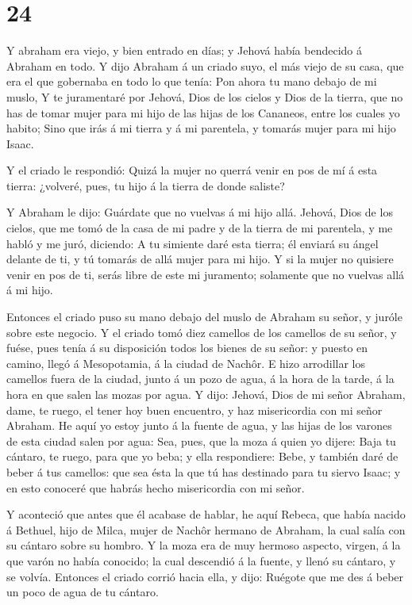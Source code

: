 \hypertarget{section-23}{%
\section{24}\label{section-23}}

 Y abraham era viejo, y bien entrado en días; y Jehová había
bendecido á Abraham en todo.  Y dijo Abraham á un criado
suyo, el más viejo de su casa, que era el que gobernaba en todo lo que
tenía: Pon ahora tu mano debajo de mi muslo,  Y te
juramentaré por Jehová, Dios de los cielos y Dios de la tierra, que no
has de tomar mujer para mi hijo de las hijas de los Cananeos, entre los
cuales yo habito;  Sino que irás á mi tierra y á mi
parentela, y tomarás mujer para mi hijo Isaac.

 Y el criado le respondió: Quizá la mujer no querrá venir en
pos de mí á esta tierra: ¿volveré, pues, tu hijo á la tierra de donde
saliste?

 Y Abraham le dijo: Guárdate que no vuelvas á mi hijo allá.
 Jehová, Dios de los cielos, que me tomó de la casa de mi
padre y de la tierra de mi parentela, y me habló y me juró, diciendo: A
tu simiente daré esta tierra; él enviará su ángel delante de ti, y tú
tomarás de allá mujer para mi hijo.  Y si la mujer no
quisiere venir en pos de ti, serás libre de este mi juramento; solamente
que no vuelvas allá á mi hijo.

 Entonces el criado puso su mano debajo del muslo de Abraham
su señor, y juróle sobre este negocio.  Y el criado tomó
diez camellos de los camellos de su señor, y fuése, pues tenía á su
disposición todos los bienes de su señor: y puesto en camino, llegó á
Mesopotamia, á la ciudad de Nachôr.  E hizo arrodillar los
camellos fuera de la ciudad, junto á un pozo de agua, á la hora de la
tarde, á la hora en que salen las mozas por agua.  Y dijo:
Jehová, Dios de mi señor Abraham, dame, te ruego, el tener hoy buen
encuentro, y haz misericordia con mi señor Abraham.  He
aquí yo estoy junto á la fuente de agua, y las hijas de los varones de
esta ciudad salen por agua:  Sea, pues, que la moza á quien
yo dijere: Baja tu cántaro, te ruego, para que yo beba; y ella
respondiere: Bebe, y también daré de beber á tus camellos: que sea ésta
la que tú has destinado para tu siervo Isaac; y en esto conoceré que
habrás hecho misericordia con mi señor.

 Y aconteció que antes que él acabase de hablar, he aquí
Rebeca, que había nacido á Bethuel, hijo de Milca, mujer de Nachôr
hermano de Abraham, la cual salía con su cántaro sobre su hombro.
 Y la moza era de muy hermoso aspecto, virgen, á la que
varón no había conocido; la cual descendió á la fuente, y llenó su
cántaro, y se volvía.  Entonces el criado corrió hacia
ella, y dijo: Ruégote que me des á beber un poco de agua de tu cántaro.

